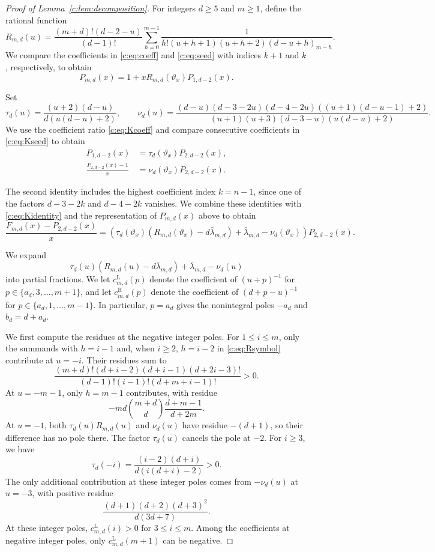 \documentclass[11pt]{article}
\numberwithin{equation}{section}
\theoremstyle{remark}\newtheorem{remark}[theorem]{Remark}
\newcommand{\varthetax}{\vartheta_x}
\begin{document}
\begin{proof}[Proof of Lemma~\ref{c:lem:decomposition}]
For integers $d\ge5$ and $m\ge1$, define the rational function
\begin{equation}\label{c:eq:Rsymbol}
 R_{m,d}(u)=\frac{(m+d)!(d-2-u)}{(d-1)!}\sum_{h=0}^{m-1}
 \frac1{h!(u+h+1)(u+h+2)(d-u+h)_{m-h}}.
\end{equation}
We compare the coefficients in \eqref{c:eq:coeff} and \eqref{c:eq:seed}
with indices $k+1$ and $k$, respectively, to obtain
\[
 P_{m,d}(x)=1+xR_{m,d}(\varthetax)P_{1,d-2}(x).
\]

Set
\begin{equation*}
 \tau_d(u)=\frac{(u+2)(d-u)}{d(u(d-u)+2)},\qquad
 \nu_d(u)=\frac{(d-u)(d-3-2u)(d-4-2u)
 ((u+1)(d-u-1)+2)}
 {(u+1)(u+3)(d-3-u)(u(d-u)+2)}.
\end{equation*}
We use the coefficient ratio \eqref{c:eq:Kcoeff} and compare consecutive
coefficients in \eqref{c:eq:Kseed} to obtain
\[
 \begin{aligned}
 P_{1,d-2}(x)&=\tau_d(\varthetax)P_{2,d-2}(x),\\
 \frac{P_{2,d-2}(x)-1}x&=\nu_d(\varthetax)P_{2,d-2}(x).
 \end{aligned}
\]

The second identity includes the highest coefficient index $k=n-1$,
since one of the factors $d-3-2k$ and $d-4-2k$ vanishes.
We combine these identities with \eqref{c:eq:Kidentity} and
the representation of $P_{m,d}(x)$ above to obtain
\begin{equation}\label{c:eq:symbolmain}
 \frac{F_{m,d}(x)-P_{2,d-2}(x)}{x}=\left(\tau_d(\varthetax)(R_{m,d}(\varthetax)-d\bar\lambda_{m,d})+\bar\lambda_{m,d}-\nu_d(\varthetax)\right)P_{2,d-2}(x).
\end{equation}

We expand
\[
 \tau_d(u)(R_{m,d}(u)-d\bar\lambda_{m,d})
 +\bar\lambda_{m,d}-\nu_d(u)
\]
into partial fractions. We let $c_{m,d}^{\mathrm L}(p)$ denote the coefficient of $(u+p)^{-1}$
for $p\in\{a_d,3,\ldots,m+1\}$, and let $c_{m,d}^{\mathrm R}(p)$
denote the coefficient of $(d+p-u)^{-1}$
for $p\in\{a_d,1,\ldots,m-1\}$.
In particular, $p=a_d$ gives
the nonintegral poles $-a_d$ and $b_d=d+a_d$.

We first compute the residues at the negative integer poles.
For $1\le i\le m$, only the summands with $h=i-1$ and, when $i\ge2$,
$h=i-2$ in
\eqref{c:eq:Rsymbol} contribute at $u=-i$. Their residues sum to
\[
 \frac{(m+d)!(d+i-2)(d+i-1)(d+2i-3)!}
 {(d-1)!(i-1)!(d+m+i-1)!}>0.
\]
At $u=-m-1$, only $h=m-1$ contributes, with residue
\[
 -md\binom{m+d}{d}\frac{d+m-1}{d+2m}.
\]
At $u=-1$, both $\tau_d(u)R_{m,d}(u)$ and $\nu_d(u)$ have
residue $-(d+1)$, so their difference has no pole there.
The factor $\tau_d(u)$ cancels the pole at $-2$. For $i\ge3$, we have
\[
 \tau_d(-i)=\frac{(i-2)(d+i)}{d(i(d+i)-2)}>0.
\]
The only additional contribution at these integer poles comes from
$-\nu_d(u)$ at $u=-3$, with positive residue
\[
 \frac{(d+1)(d+2)(d+3)^2}{d(3d+7)}.
\]
At these integer poles, $c_{m,d}^{\mathrm L}(i)>0$ for $3\le i\le m$.
Among the coefficients at negative integer poles, only
$c_{m,d}^{\mathrm L}(m+1)$ can be negative.


\end{proof}
\end{document}
